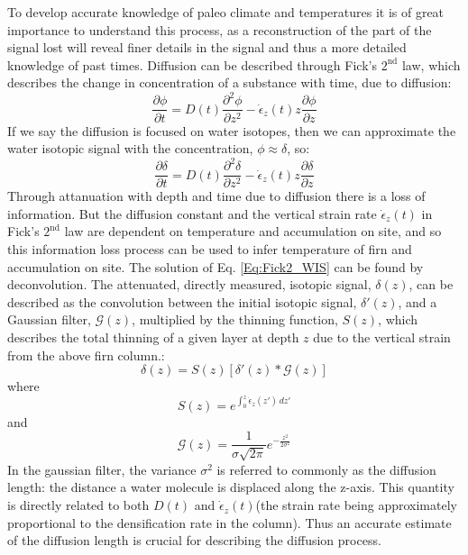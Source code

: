 \documentclass[../../CompleteThesis2/Complete_2ndDraft]{subfiles}
\begin{document}
To develop accurate knowledge of paleo climate and temperatures it is of great importance to understand this process, as a reconstruction of the part of the signal lost will reveal finer details in the signal and thus a more detailed knowledge of past times. 
Diffusion can be described through Fick's $2^{\text{nd}}$ law, which describes the change in concentration of a substance with time, due to diffusion:
\begin{equation}
	\frac{\partial \phi}{\partial t} = D(t) \frac{\partial^2 \phi}{\partial z^2} - \dot{\epsilon}_z(t) z \frac{\partial \phi}{\partial z}
	\label{Eq:Fick2_concentration}
\end{equation}
If we say the diffusion is focused on water isotopes, then we can approximate the water isotopic signal with the concentration, $\phi \approx \delta$, so:
\begin{equation}
	\frac{\partial \delta}{\partial t} = D(t) \frac{\partial^2 \delta}{\partial z^2} - \dot{\epsilon}_z(t) z \frac{\partial \delta}{\partial z}
	\label{Eq:Fick2_WIS}
\end{equation}
Through attanuation with depth and time due to diffusion there is a loss of information. But the diffusion constant and the vertical strain rate $\dot{\epsilon}_z(t)$ in Fick's $2^{\text{nd}}$ law are dependent on temperature and accumulation on site, and so this information loss process can be used to infer temperature of firn and accumulation on site. 
The solution of Eq. \ref{Eq:Fick2_WIS} can be found by deconvolution. The attenuated, directly measured, isotopic signal, $\delta(z)$, can be described as the convolution between the initial isotopic signal, $\delta '(z)$, and a Gaussian filter, $\mathcal{G}(z)$, multiplied by the thinning function, $S(z)$, which describes the total thinning of a given layer at depth $z$ due to the vertical strain from the above firn column.:
\begin{equation}
	\delta(z) = S(z)[\delta'(z)*\mathcal{G}(z)]
	\label{Eq:diff_solution_conv}
\end{equation}
where
\begin{equation}
	S(z) = e^{\int_{0}^{z}\dot{\epsilon}_z(z')\, dz'}
	\label{Eq:Thinning_fct}
\end{equation}
and
\begin{equation}
	\mathcal{G}(z) = \frac{1}{\sigma\sqrt{2\pi}}e^{-\frac{z^2}{2\sigma^2}}
	\label{Eq:Gauss_filter}
\end{equation}
In the gaussian filter, the variance $\sigma^2$ is referred to commonly as the diffusion length: the distance a water molecule is displaced along the z-axis. This quantity is directly related to both $D(t)$ and $\dot{\epsilon}_z(t)$(the strain rate being approximately proportional to the densification rate in the column). Thus an accurate estimate of the diffusion length is crucial for describing the diffusion process.
\end{document}
